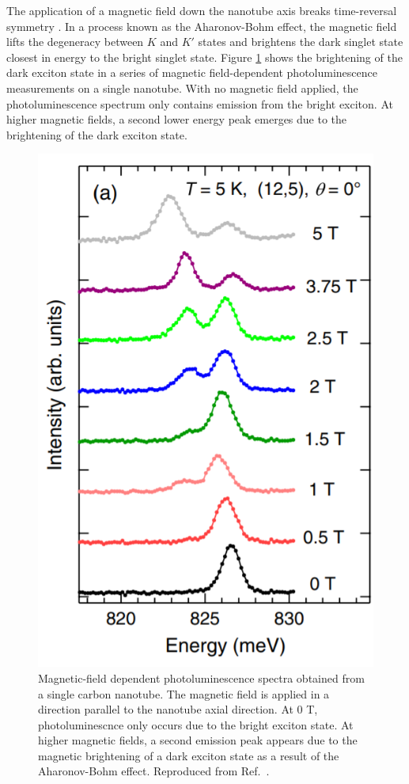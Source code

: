 The application of a magnetic field down the nanotube axis breaks time-reversal symmetry \cite{srivastava2008direct}. In a process known as the Aharonov-Bohm effect, the magnetic field lifts the degeneracy between $K$ and $K'$ states and brightens the dark singlet state closest in energy to the bright singlet state. Figure \ref{fig:exciton_brightening} shows the brightening of the dark exciton state in a series of magnetic field-dependent photoluminescence measurements on a single nanotube. With no magnetic field applied, the photoluminescence spectrum only contains emission from the bright exciton. At higher magnetic fields, a second lower energy peak emerges due to the brightening of the dark exciton state.

\begin{figure}[ht]
	\centering
	\includegraphics[scale=0.5]{images/chapter_optical_props/dark_brightening_srivastava}
	\caption{Magnetic-field dependent photoluminescence spectra obtained from a single carbon nanotube. The magnetic field is applied in a direction parallel to the nanotube axial direction. At 0 T, photoluminescnce only occurs due to the bright exciton state. At higher magnetic fields, a second emission peak appears due to the magnetic brightening of a dark exciton state as a result of the Aharonov-Bohm effect.  Reproduced from Ref.\ \cite{srivastava2008direct}.}
	\label{fig:exciton_brightening}
\end{figure}


